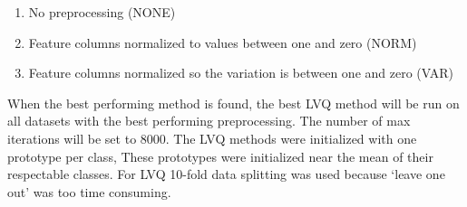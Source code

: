 \begin{enumerate}
  \item No preprocessing (NONE)
  \item Feature columns normalized to values between one and zero (NORM)
  \item Feature columns normalized so the variation is between one and zero (VAR)
\end{enumerate}

When the best performing method is found, the best LVQ method will be run on all datasets with the best performing preprocessing. The number of max iterations will be set to 8000.
The LVQ methods were initialized with one prototype per class, These prototypes were initialized near the mean of their respectable classes. For LVQ 10-fold data splitting was used because `leave one out' was too time consuming.




